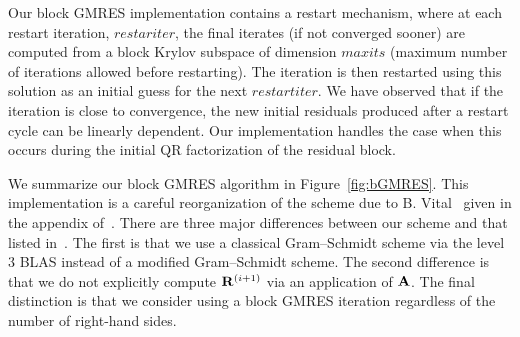 \documentclass[twoside]{siamltex}
\newcommand{\bA}{{\bf A}}
\newcommand{\bR}{{\bf R}}
\begin{document}
Our block GMRES implementation contains a restart mechanism, where
at each restart iteration, $restariter$, the final iterates (if
not converged sooner) are computed from a block Krylov subspace of
dimension $maxits$ (maximum number of iterations allowed before
restarting). The iteration is then restarted using this solution
as an initial guess for the next $restartiter$. We have observed
that if the iteration is close to convergence, the new initial
residuals produced after a restart cycle can be linearly
dependent. Our implementation handles the case when this occurs
during the initial QR factorization of the residual block.

We summarize our block GMRES algorithm in Figure~\ref{fig:bGMRES}.
This implementation is a careful reorganization of the scheme due
to B. Vital~\cite{vita:90} given in the appendix
of~\cite{siga:95}. There are three major differences between our
scheme and that listed in~\cite{siga:95}. The first is that we use
a classical Gram--Schmidt scheme via the level 3 BLAS instead of a
modified Gram--Schmidt scheme. The second difference is that we do
not explicitly compute $\bR^{(i+1)}$ via an application of $\bA$.
The final distinction is that we consider using a block GMRES
iteration regardless of the number of right-hand sides.
\end{document}
